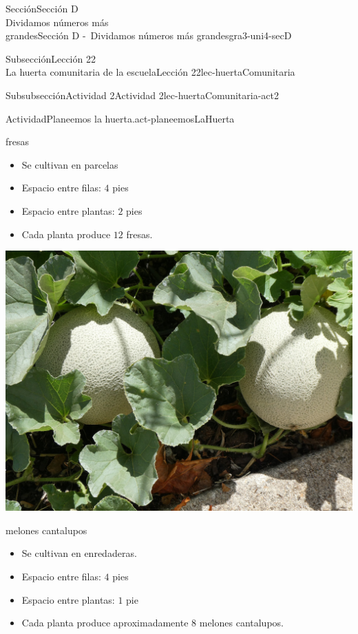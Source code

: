 \begin{sectionptx}{Sección}{{\Large Sección D\\}Dividamos números más\\grandes}{}{Sección D -~Dividamos números más grandes}{}{}{gra3-uni4-secD}
\begin{subsectionptx}{Subsección}{{\normalsize Lección 22\\[-0.05cm]}La huerta comunitaria de la escuela}{}{Lección 22}{}{}{lec-huertaComunitaria}
\begin{subsubsectionptx}{Subsubsección}{Actividad 2}{}{Actividad 2}{}{}{lec-huertaComunitaria-act2}
\begin{activity}{Actividad}{Planeemos la huerta.}{act-planeemosLaHuerta}
\begin{sidebyside}{2}{0.025}{0.025}{0.05}
\begin{sbspanel}{0.45}
%
\par
fresas%
%
\begin{itemize}[label=\textbullet]
\item{}Se cultivan en parcelas%
\item{}Espacio entre filas: \(4\) pies%
\item{}Espacio entre plantas: \(2\) pies%
\item{}Cada planta produce \(12\) fresas.%
\end{itemize}
\end{sbspanel}%
\begin{sbspanel}{0.45}%
\includegraphics[max width=0.8\linewidth, center]{external/jpg-source/3-4-D-22 Act2-melon-cantalupo.jpg}
%
\par
melones cantalupos%
%
\begin{itemize}[label=\textbullet]
\item{}Se cultivan en enredaderas.%
\item{}Espacio entre filas: \(4\) pies%
\item{}Espacio entre plantas: \(1\) pie%
\item{}Cada planta produce aproximadamente \(8\) melones cantalupos.%
\end{itemize}
\end{sbspanel}%
\end{sidebyside}%
\begin{sidebyside}{2}{0.025}{0.025}{0.05}%
\begin{sbspanel}{0.45}%

\end{sbspanel}
\end{sidebyside}
\end{activity}
\end{subsubsectionptx}
\end{subsectionptx}
\end{sectionptx}
